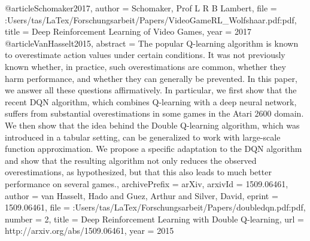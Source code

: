 @article{Schomaker2017,
author = {Schomaker, Prof L R B Lambert},
file = {:Users/tas/LaTex/Forschungsarbeit/Papers/VideoGameRL{\_}Wolfshaar.pdf:pdf},
title = {{Deep Reinforcement Learning of Video Games}},
year = {2017}
}
@article{VanHasselt2015,
abstract = {The popular Q-learning algorithm is known to overestimate action values under certain conditions. It was not previously known whether, in practice, such overestimations are common, whether they harm performance, and whether they can generally be prevented. In this paper, we answer all these questions affirmatively. In particular, we first show that the recent DQN algorithm, which combines Q-learning with a deep neural network, suffers from substantial overestimations in some games in the Atari 2600 domain. We then show that the idea behind the Double Q-learning algorithm, which was introduced in a tabular setting, can be generalized to work with large-scale function approximation. We propose a specific adaptation to the DQN algorithm and show that the resulting algorithm not only reduces the observed overestimations, as hypothesized, but that this also leads to much better performance on several games.},
archivePrefix = {arXiv},
arxivId = {1509.06461},
author = {van Hasselt, Hado and Guez, Arthur and Silver, David},
eprint = {1509.06461},
file = {:Users/tas/LaTex/Forschungsarbeit/Papers/doubledqn.pdf:pdf},
number = {2},
title = {{Deep Reinforcement Learning with Double Q-learning}},
url = {http://arxiv.org/abs/1509.06461},
year = {2015}
}

